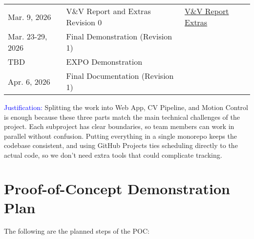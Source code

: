 \documentclass{article}
\begin{document}
\begin{table}[h]
\begin{tabularx}{\textwidth}{llX}
    Mar. 9, 2026     & V\&V Report and Extras Revision 0             & \href{https://github.com/ZifanSi/vision-guided-tracker/blob/main/docs/VnVReport/VnVReport.pdf}{V\&V Report}   \newline
    \href{https://github.com/ZifanSi/vision-guided-tracker/tree/main/docs/Extras}{Extras}
    \\
    Mar. 23-29, 2026 & Final Demonstration (Revision 1)              &                                                                                                                                                  \\
    TBD              & EXPO Demonstration                            &                                                                                                                                                  \\
    Apr. 6, 2026     & Final Documentation (Revision 1)              &                                                                                                                                                  \\
    \bottomrule
  \end{tabularx}
\end{table}
\FloatBarrier

\textcolor{blue}{Justification:} Splitting the work into Web App, CV Pipeline,
and Motion Control is enough because these three parts match the main technical
challenges of the project. Each subproject has clear boundaries, so team members
can work in parallel without confusion. Putting everything in a single monorepo
keeps the codebase consistent, and using GitHub Projects ties scheduling directly
to the actual code, so we don’t need extra tools that could complicate tracking.


\section{Proof-of-Concept Demonstration Plan}

The following are the planned steps of the POC:
\end{document}
